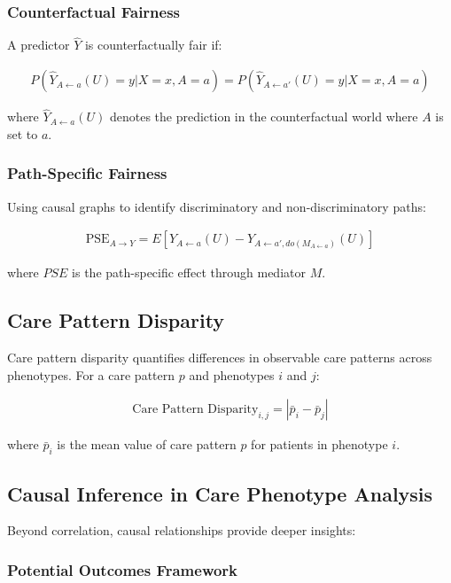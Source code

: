 \documentclass[12pt]{article}
\begin{document}
\subsubsection{Counterfactual Fairness}

A predictor $\hat{Y}$ is counterfactually fair if:

\begin{align}
P(\hat{Y}_{A \leftarrow a}(U) = y | X = x, A = a) = P(\hat{Y}_{A \leftarrow a'}(U) = y | X = x, A = a)
\end{align}

where $\hat{Y}_{A \leftarrow a}(U)$ denotes the prediction in the counterfactual world where $A$ is set to $a$.

\subsubsection{Path-Specific Fairness}

Using causal graphs to identify discriminatory and non-discriminatory paths:

\begin{align}
\text{PSE}_{A \rightarrow Y} = E[Y_{A \leftarrow a}(U) - Y_{A \leftarrow a', do(M_{A \leftarrow a})}(U)]
\end{align}

where $PSE$ is the path-specific effect through mediator $M$.

\subsection{Care Pattern Disparity}

Care pattern disparity quantifies differences in observable care patterns across phenotypes. For a care pattern $p$ and phenotypes $i$ and $j$:

\begin{align}
\text{Care Pattern Disparity}_{i,j} = |\bar{p}_i - \bar{p}_j|
\end{align}

where $\bar{p}_i$ is the mean value of care pattern $p$ for patients in phenotype $i$.

\subsection{Causal Inference in Care Phenotype Analysis}

Beyond correlation, causal relationships provide deeper insights:

\subsubsection{Potential Outcomes Framework}
\end{document}
